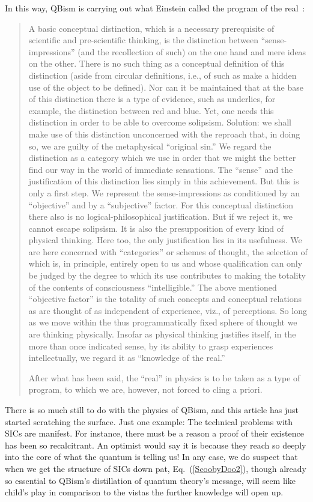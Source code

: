 \documentclass[aps,pra,superscriptaddress,10pt,tightenlines,twocolumn,nofootinbib]{revtex4}
\begin{document}
In this way, QBism is carrying out what Einstein called the program of the real~\cite{Einstein49b}:
\begin{quote}
\noindent  A basic conceptual distinction, which is a necessary
prerequisite of scientific and pre-scientific thinking, is the
distinction between ``sense-impressions'' (and the recollection of
such) on the one hand and mere ideas on the other.  There is no such
thing as a conceptual definition of this distinction (aside from
circular definitions, i.e., of such as make a hidden use of the object
to be defined). Nor can it be maintained that at the base of this
distinction there is a type of evidence, such as underlies, for
example, the distinction between red and blue. Yet, one needs this
distinction in order to be able to overcome solipsism. Solution: we
shall make use of this distinction unconcerned with the reproach that,
in doing so, we are guilty of the metaphysical ``original sin.'' We
regard the distinction as a category which we use in order that we
might the better find our way in the world of immediate
sensations. The ``sense'' and the justification of this distinction
lies simply in this achievement. But this is only a first step. We
represent the sense-impressions as conditioned by an ``objective'' and
by a ``subjective'' factor. For this conceptual distinction there also
is no logical-philosophical justification. But if we reject it, we
cannot escape solipsism. It is also the presupposition of every kind
of physical thinking. Here too, the only justification lies in its
usefulness. We are here concerned with ``categories'' or schemes of
thought, the selection of which is, in principle, entirely open to us
and whose qualification can only be judged by the degree to which its
use contributes to making the totality of the contents of
consciousness ``intelligible.'' The above mentioned ``objective
factor'' is the totality of such concepts and conceptual relations as
are thought of as independent of experience, viz., of perceptions. So
long as we move within the thus programmatically fixed sphere of
thought we are thinking physically. Insofar as physical thinking
justifies itself, in the more than once indicated sense, by its
ability to grasp experiences intellectually, we regard it as
``knowledge of the real.''

After what has been said, the ``real'' in physics is to be taken as a type of program,
to which we are, however, not forced to cling a priori.
\end{quote}

There is so much still to do with the physics of QBism, and this article has just started scratching the surface.  Just one example:  The technical problems with SICs are manifest.  For instance, there must be a reason a proof of their existence has been so recalcitrant.  An optimist would say it is because they reach so deeply into the core of what the quantum is telling us!  In any case, we do suspect that when we get the structure of SICs down pat, Eq.~(\ref{ScoobyDoo2}), though already so essential to QBism's distillation of quantum theory's message, will seem like child's play in comparison to the vistas the further knowledge will open up.
\end{document}
